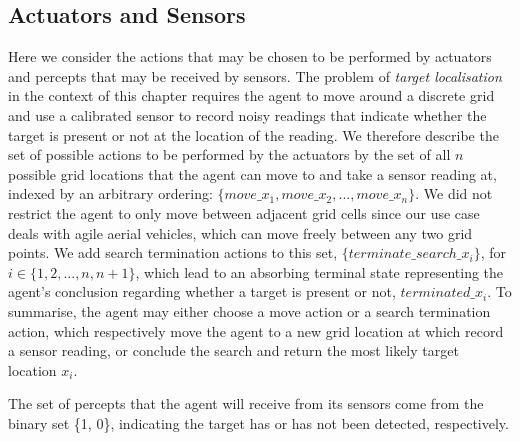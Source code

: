 \subsection{Actuators and Sensors}
Here we consider the actions that may be chosen to be performed by actuators and percepts that may be received by sensors. The problem of \textit{target localisation} in the context of this chapter requires the agent to move around a discrete grid and use a calibrated sensor to record noisy readings that indicate whether the target is present or not at the location of the reading. We therefore describe the set of possible actions to be performed by the actuators by the set of all $n$ possible grid locations that the agent can move to and take a sensor reading at, indexed by an arbitrary ordering: $\{move\_x_1, move\_x_2, ..., move\_x_n\}$. We did not restrict the agent to only move between adjacent grid cells since our use case deals with agile aerial vehicles, which can move freely between any two grid points. We add search termination actions to this set, $\{terminate\_search\_x_{i}\}$, for $i \in \{1, 2, ..., n, n+1\}$, which lead to an absorbing terminal state representing the agent's conclusion regarding whether a target is present or not, $terminated\_x_{i}$. To summarise, the agent may either choose a move action or a search termination action, which respectively move the agent to a new grid location at which record a sensor reading, or conclude the search and return the most likely target location $x_i$. \par

The set of percepts that the agent will receive from its sensors come from the binary set \{1, 0\}, indicating the target has or has not been detected, respectively.\par

